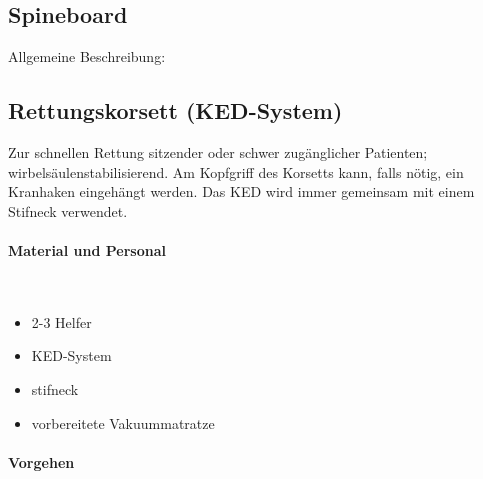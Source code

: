 \subsection{Spineboard}
\label{topic:spineboard-anwendung}

Allgemeine Beschreibung:


\gTakeNotesMedium

\clearpage
\subsection{Rettungskorsett (KED-System)}
\label{topic:rettungskorsett-anwendung}

Zur schnellen Rettung sitzender oder schwer zugänglicher
Patienten; wirbelsäulenstabilisierend. Am Kopfgriff des
Korsetts kann, falls nötig, ein Kranhaken eingehängt
werden. Das KED wird immer gemeinsam mit einem Stifneck
verwendet.

\paragraph*{Material und Personal}~

\begin{itemize}
    \item 2-3 Helfer
    \item KED-System
    \item stifneck
    \item vorbereitete Vakuummatratze
\end{itemize}


\paragraph*{Vorgehen}~

